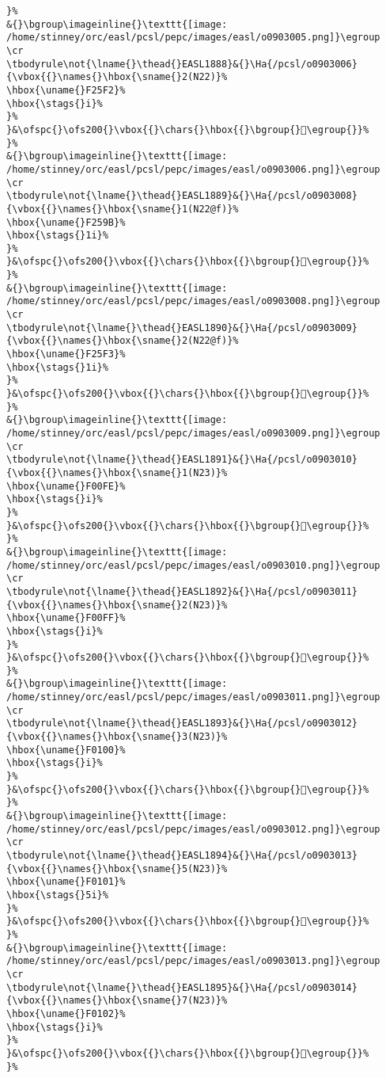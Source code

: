 \begin{verbatim}
}%
&{}\bgroup\imageinline{}\texttt{[image: /home/stinney/orc/easl/pcsl/pepc/images/easl/o0903005.png]}\egroup
\cr
\tbodyrule\not{\lname{}\thead{}EASL1888}&{}\Ha{/pcsl/o0903006}{\vbox{{}\names{}\hbox{\sname{}2(N22)}%
\hbox{\uname{}F25F2}%
\hbox{\stags{}i}%
}%
}&\ofspc{}\ofs200{}\vbox{{}\chars{}\hbox{{}\bgroup{}󲗲\egroup{}}%
}%
&{}\bgroup\imageinline{}\texttt{[image: /home/stinney/orc/easl/pcsl/pepc/images/easl/o0903006.png]}\egroup
\cr
\tbodyrule\not{\lname{}\thead{}EASL1889}&{}\Ha{/pcsl/o0903008}{\vbox{{}\names{}\hbox{\sname{}1(N22@f)}%
\hbox{\uname{}F259B}%
\hbox{\stags{}1i}%
}%
}&\ofspc{}\ofs200{}\vbox{{}\chars{}\hbox{{}\bgroup{}󲖛\egroup{}}%
}%
&{}\bgroup\imageinline{}\texttt{[image: /home/stinney/orc/easl/pcsl/pepc/images/easl/o0903008.png]}\egroup
\cr
\tbodyrule\not{\lname{}\thead{}EASL1890}&{}\Ha{/pcsl/o0903009}{\vbox{{}\names{}\hbox{\sname{}2(N22@f)}%
\hbox{\uname{}F25F3}%
\hbox{\stags{}1i}%
}%
}&\ofspc{}\ofs200{}\vbox{{}\chars{}\hbox{{}\bgroup{}󲗳\egroup{}}%
}%
&{}\bgroup\imageinline{}\texttt{[image: /home/stinney/orc/easl/pcsl/pepc/images/easl/o0903009.png]}\egroup
\cr
\tbodyrule\not{\lname{}\thead{}EASL1891}&{}\Ha{/pcsl/o0903010}{\vbox{{}\names{}\hbox{\sname{}1(N23)}%
\hbox{\uname{}F00FE}%
\hbox{\stags{}i}%
}%
}&\ofspc{}\ofs200{}\vbox{{}\chars{}\hbox{{}\bgroup{}󰃾\egroup{}}%
}%
&{}\bgroup\imageinline{}\texttt{[image: /home/stinney/orc/easl/pcsl/pepc/images/easl/o0903010.png]}\egroup
\cr
\tbodyrule\not{\lname{}\thead{}EASL1892}&{}\Ha{/pcsl/o0903011}{\vbox{{}\names{}\hbox{\sname{}2(N23)}%
\hbox{\uname{}F00FF}%
\hbox{\stags{}i}%
}%
}&\ofspc{}\ofs200{}\vbox{{}\chars{}\hbox{{}\bgroup{}󰃿\egroup{}}%
}%
&{}\bgroup\imageinline{}\texttt{[image: /home/stinney/orc/easl/pcsl/pepc/images/easl/o0903011.png]}\egroup
\cr
\tbodyrule\not{\lname{}\thead{}EASL1893}&{}\Ha{/pcsl/o0903012}{\vbox{{}\names{}\hbox{\sname{}3(N23)}%
\hbox{\uname{}F0100}%
\hbox{\stags{}i}%
}%
}&\ofspc{}\ofs200{}\vbox{{}\chars{}\hbox{{}\bgroup{}󰄀\egroup{}}%
}%
&{}\bgroup\imageinline{}\texttt{[image: /home/stinney/orc/easl/pcsl/pepc/images/easl/o0903012.png]}\egroup
\cr
\tbodyrule\not{\lname{}\thead{}EASL1894}&{}\Ha{/pcsl/o0903013}{\vbox{{}\names{}\hbox{\sname{}5(N23)}%
\hbox{\uname{}F0101}%
\hbox{\stags{}5i}%
}%
}&\ofspc{}\ofs200{}\vbox{{}\chars{}\hbox{{}\bgroup{}󰄁\egroup{}}%
}%
&{}\bgroup\imageinline{}\texttt{[image: /home/stinney/orc/easl/pcsl/pepc/images/easl/o0903013.png]}\egroup
\cr
\tbodyrule\not{\lname{}\thead{}EASL1895}&{}\Ha{/pcsl/o0903014}{\vbox{{}\names{}\hbox{\sname{}7(N23)}%
\hbox{\uname{}F0102}%
\hbox{\stags{}i}%
}%
}&\ofspc{}\ofs200{}\vbox{{}\chars{}\hbox{{}\bgroup{}󰄂\egroup{}}%
}%

\end{verbatim}
